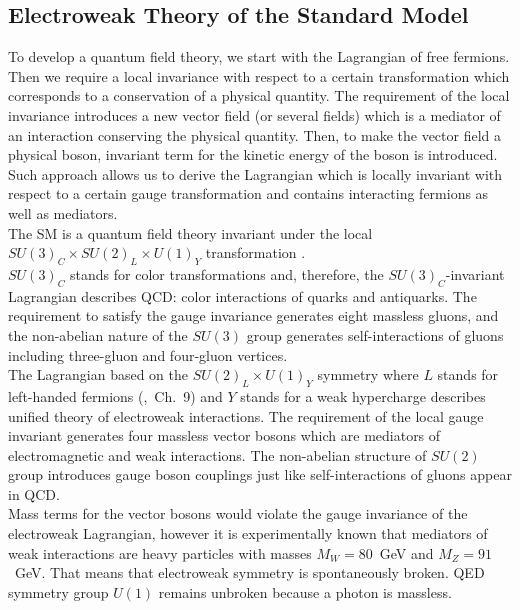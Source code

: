 \subsection{Electroweak Theory of the Standard Model}
\label{sec:WgAbout_SMEWK}

To develop a quantum field theory, we start with the Lagrangian of free fermions. Then we require a local invariance with respect to a certain transformation which corresponds to a conservation of a physical quantity. The requirement of the local invariance introduces a new vector field (or several fields) which is a mediator of an interaction conserving the physical quantity. Then, to make the vector field a physical boson, invariant term for the kinetic energy of the boson is introduced. Such approach allows us to derive the Lagrangian which is locally invariant with respect to a certain gauge transformation and contains interacting fermions as well as mediators. \\ 

The SM is a quantum field theory invariant under the local $SU(3)_C \times SU(2)_L \times U(1)_Y$ transformation \cite{ref_Pich}.\\ 

$SU(3)_C$ stands for color transformations and, therefore, the $SU(3)_C$-invariant Lagrangian describes QCD: color interactions of quarks and antiquarks. The requirement to satisfy the gauge invariance generates eight massless gluons, and the non-abelian nature of the $SU(3)$ group generates self-interactions of gluons including three-gluon and four-gluon vertices.\\

The Lagrangian based on the $SU(2)_L \times U(1)_Y$ symmetry where $L$ stands for left-handed fermions (\cite{ref_Griffiths},~Ch.~9) and $Y$ stands for a weak hypercharge describes unified theory of electroweak interactions. The requirement of the local gauge invariant generates four massless vector bosons which are mediators of electromagnetic and weak interactions. The non-abelian structure of $SU(2)$ group introduces gauge boson couplings just like self-interactions of gluons appear in QCD.\\ 

Mass terms for the vector bosons would violate the gauge invariance of the electroweak Lagrangian, however it is experimentally known that mediators of weak interactions are heavy particles with masses $M_W=80$~GeV and $M_Z=91$~GeV. That means that electroweak symmetry is spontaneously broken. QED symmetry group $U(1)$ remains unbroken because a photon is massless.\\

